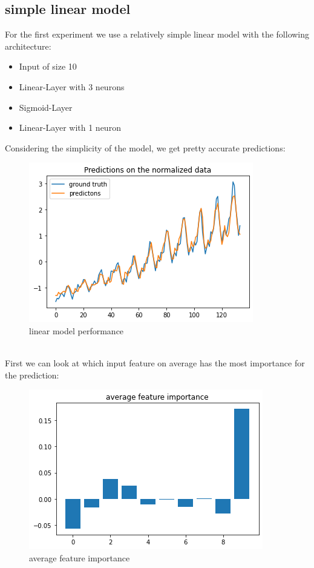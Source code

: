 \documentclass{article}
\begin{document}
\subsection{simple linear model}
For the first experiment we use a relatively simple linear model with the following architecture: 
\begin{itemize}
\item Input of size 10
\item Linear-Layer with 3 neurons
\item Sigmoid-Layer
\item Linear-Layer with 1 neuron
\end{itemize}
Considering the simplicity of the model, we get pretty accurate predictions:
\begin{figure}[h!]
\centering
\includegraphics[scale=0.6]{results/linear_model_prediction.png}
\caption{linear model performance}
\label{fig:lin_model_perf}
\end{figure} \\
First we can look at which input feature on average has the most importance for the prediction:
\begin{figure}[ht!]
\centering
\includegraphics[scale=0.6]{results/linear_model_avg_feature_importance.png}
\caption{average feature importance}
\label{fig:lin_model_afi}
\end{figure} \\
\end{document}
